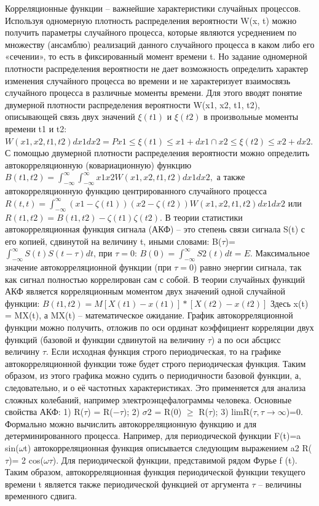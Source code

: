 \documentclass[a4paper, 12pt]{article}
\begin{document}
	Корреляционные функции – важнейшие характеристики случайных процессов. Используя одномерную плотность распределения вероятности W(x, t) можно получить параметры случайного процесса, которые являются усреднением по множеству (ансамблю) реализаций данного случайного процесса в каком либо его «сечении», то есть в фиксированный момент времени t. Но задание одномерной плотности распределения вероятности не дает возможность определить характер изменения случайного процесса во времени и не характеризует взаимосвязь случайного процесса в различные моменты времени. Для этого вводят понятие двумерной плотности распределения вероятности
	W(x1, x2, t1, t2), описывающей связь двух значений  $\xi(t1)$ и $\xi(t2)$ в произвольные моменты времени t1 и t2:
	$W(x1,x2,t1,t2)dx1dx2 =P{x1 \leq \xi(t1) \leq x1 +dx1 \cap x2 \leq \xi(t2) \leq x2 +dx2}$.
	С помощью двумерной плотности распределения вероятности можно определить автокорреляционную (ковариационную) функцию $B(t1,t2)=\int_{-\infty}^{\infty} \int_{-\infty}^{\infty} x1x2W(x1,x2,t1,t2)dx1dx2 ,$
	а также автокорреляционную функцию центрированного случайного процесса
	$R(t,t)=\int_{-\infty}^{\infty} (x1-\zeta(t1))(x2-\zeta(t2))W(x1,x2,t1,t2)dx1dx2$
	или
	$R(t1 ,t2 ) = B(t1 ,t2 ) - \zeta (t1 )\zeta (t2) $.
	В теории статистики автокорреляционная функция сигнала (АКФ) – это степень связи сигнала S(t) с его копией, сдвинутой на величину t, иными словами:
	B($\tau$)= $\int_{-\infty}^{\infty} S(t)S(t-\tau)dt$, 
	при $\tau = 0$:
	$B(0)= \int_{-\infty}^{\infty} S2(t)dt=E.$
	Максимальное значение автокорреляционной функции (при $\tau=0$) равно энергии сигнала, так как сигнал полностью коррелирован сам с собой.
	В теории случайных функций АКФ является корреляционным моментом двух значений одной случайной функции:
	$B(t1,t2)=M{[X(t1)-x(t1)]*[X(t2)-x(t2)]}$
	Здесь x(t) = MX(t), а MX(t) – математическое ожидание.
	График автокорреляционной функции можно получить, отложив по оси ординат
	коэффициент корреляции двух функций (базовой и функции сдвинутой на величину $\tau$) а по оси абсцисс величину $\tau$. Если исходная функция строго
	периодическая, то на графике автокорреляционной функции тоже будет строго периодическая функция. Таким образом, из этого графика можно судить о периодичности базовой функции, а, следовательно, и о её частотных характеристиках. Это применяется для анализа сложных колебаний, например электроэнцефалограммы человека.
	Основные свойства АКФ: 1) R($\tau$) = R($-\tau$);
	2) $\sigma$2 = R(0) $\geq$ R($\tau$);
	3) limR($\tau, \tau \to \infty$)=0.
	Формально можно вычислить автокорреляционную функцию и для детерминированного процесса. Например, для периодической функции F(t)=a sin($\omega$t) автокорреляционная функция описывается следующим выражением
	a2
	R($\tau$)= 2 cos($\omega \tau$).
	Для периодической функции, представимой рядом Фурье f (t).
	Таким образом, автокорреляционная функция периодической функции текущего времени t является также периодической функцией от аргумента $\tau$ – величины временного сдвига.
	
\end{document}
